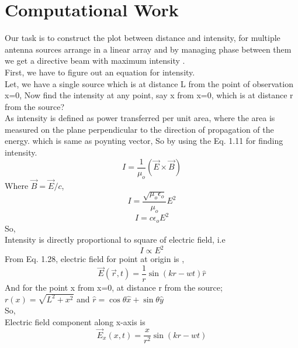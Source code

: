 \section{Computational Work}
Our task is to construct the plot between distance and intensity, for multiple antenna sources arrange in a linear array and by managing phase between them we get a directive beam with maximum intensity .\\
First, we have to figure out an equation for intensity.\\
Let, we have a single source which is at distance L from the point of observation x=0, Now find the intensity at any point, say x from x=0, which is at distance r from the source?\\
As intensity is defined as power transferred per unit area, where the area is measured on the plane perpendicular to the direction of propagation of the energy. which is same as poynting vector, So by using the Eq. 1.11 for finding intensity.\\
\begin{equation}
I = \frac{1}{\mu_{o}}(\vec{E}\times\vec{B})
\end{equation}
Where $\vec{B} = \vec{E}/c$,\\
\begin{equation}
I = \frac{\sqrt{\mu_{o}{\epsilon_{o}}}}{\mu_{o}}E^2
\end{equation}
\begin{equation}
I = c\epsilon_{o}E^2
\end{equation}
So,\\
Intensity is directly proportional to square of electric field, i.e\\
\begin{equation}
I \propto E^2
\end{equation}
From Eq. 1.28, electric field for point at origin is ,\\
\begin{equation}
\vec{E}(\vec{r},t) = \frac{1}{r}\sin(kr-wt)\hat{r}
\end{equation}
And for the point x from x=0, at distance r from the source;\\
$r(x) = \sqrt{L^2+x^2}$ and $\hat{r} = \cos\theta\hat{x}+\sin\theta\hat{y}$\\
So,\\
Electric field component along x-axis is\\
\begin{equation}
\vec{E}_x(x,t) = \frac{x}{r^2}\sin(kr-wt)
\end{equation}
